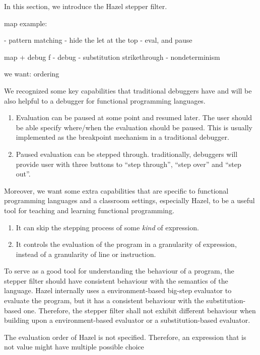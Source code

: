 In this section, we introduce the Hazel stepper filter.

map example: 

  - pattern matching
  - hide the let at the top
  - eval, and pause

map + debug f
  - debug
  - substitution strikethrough
  - nondeterminism


we want:
 ordering





We recognized some key capabilities that traditional debuggers have and will be
also helpful to a debugger for functional programming languages.
\begin{enumerate}
  \item Evaluation can be paused at some point and resumed later. The user
    should be able specify where/when the evaluation should be paused. This is
    usually implemented as the breakpoint mechanism in a traditional debugger.
  \item Paused evaluation can be stepped through. traditionally, debuggers will
    provide user with three buttons to ``step through'', ``step over'' and
    ``step out''.
\end{enumerate}

Moreover, we want some extra capabilities that are specific to functional
programming languages and a classroom settings, especially Hazel, to be a
useful tool for teaching and learning functional programming.
\begin{enumerate}
  \item It can skip the stepping process of some \emph{kind} of expression.
  \item It controls the evaluation of the program in a granularity of
  expression, instead of a granularity of line or instruction.
\end{enumerate}

To serve as a good tool for understanding the behaviour of a program, the stepper
filter should have consistent behaviour with the semantics of the language. Hazel
internally uses a environment-based big-step evaluator to evaluate the program,
but it has a consistent behaviour with the substitution-based one. Therefore,
the stepper filter shall not exhibit different behaviour when building upon a
environment-based evaluator or a substitution-based evaluator.

The evaluation order of Hazel is not specified. Therefore, an expression that is
not value might have multiple possible choice 

